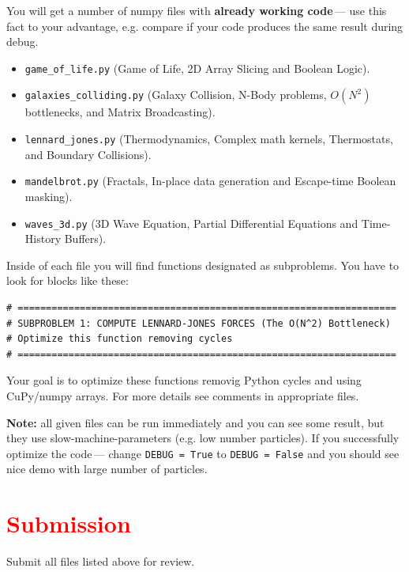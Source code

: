 \documentclass[11pt]{article}
\begin{document}
You will get a number of numpy files with \textbf{already working code}\,--- use this fact to your advantage, e.g. compare if your code produces the same result during debug.
\begin{itemize}
 \item \lstinline|game_of_life.py| (Game of Life, 2D Array Slicing and Boolean Logic).
\item \lstinline|galaxies_colliding.py| (Galaxy Collision, N-Body problems, $O(N^2)$ bottlenecks, and Matrix Broadcasting).
\item \lstinline|lennard_jones.py| (Thermodynamics, Complex math kernels, Thermostats, and Boundary Collisions).
\item \lstinline|mandelbrot.py| (Fractals, In-place data generation and Escape-time Boolean masking).
\item \lstinline|waves_3d.py| (3D Wave Equation, Partial Differential Equations and Time-History Buffers).
\end{itemize}
Inside of each file you will find functions designated as subproblems. You have to look for blocks like these:
\begin{lstlisting}
# ===================================================================
# SUBPROBLEM 1: COMPUTE LENNARD-JONES FORCES (The O(N^2) Bottleneck)
# Optimize this function removing cycles
# ===================================================================
\end{lstlisting}
Your goal is to optimize these functions removig Python cycles and using CuPy/numpy arrays. For more details see comments in appropriate files.

\textbf{Note:} all given files can be run immediately and you can see some result, but they use slow-machine-parameters (e.g. low number particles). If you successfully optimize the code\,--- change \lstinline|DEBUG = True| to \lstinline|DEBUG = False| and you should see nice demo with large number of particles.


\section*{\textcolor{red}{Submission}}

Submit all files listed above for review.
\end{document}

